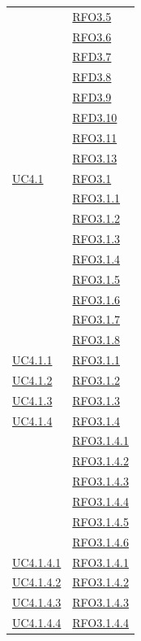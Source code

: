\begin{longtable}{|>{\centering}m{5cm}|m{5cm}<{\centering}|}
& \hyperlink{RFO3.5}{RFO3.5}\\
& \hyperlink{RFO3.6}{RFO3.6}\\
& \hyperlink{RFD3.7}{RFD3.7}\\
& \hyperlink{RFD3.8}{RFD3.8}\\
& \hyperlink{RFD3.9}{RFD3.9}\\
& \hyperlink{RFD3.10}{RFD3.10}\\
& \hyperlink{RFO3.11}{RFO3.11}\\
& \hyperlink{RFO3.13}{RFO3.13}\\ \hline
\hyperref[UC4.1]{UC4.1} & \hyperlink{RFO3.1}{RFO3.1}\\
& \hyperlink{RFO3.1.1}{RFO3.1.1}\\
& \hyperlink{RFO3.1.2}{RFO3.1.2}\\
& \hyperlink{RFO3.1.3}{RFO3.1.3}\\
& \hyperlink{RFO3.1.4}{RFO3.1.4}\\
& \hyperlink{RFO3.1.5}{RFO3.1.5}\\
& \hyperlink{RFO3.1.6}{RFO3.1.6}\\
& \hyperlink{RFO3.1.7}{RFO3.1.7}\\
& \hyperlink{RFO3.1.8}{RFO3.1.8}\\ \hline
\hyperref[UC4.1.1]{UC4.1.1} & \hyperlink{RFO3.1.1}{RFO3.1.1}\\ \hline
\hyperref[UC4.1.2]{UC4.1.2} & \hyperlink{RFO3.1.2}{RFO3.1.2}\\ \hline
\hyperref[UC4.1.3]{UC4.1.3} & \hyperlink{RFO3.1.3}{RFO3.1.3}\\ \hline
\hyperref[UC4.1.4]{UC4.1.4} & \hyperlink{RFO3.1.4}{RFO3.1.4}\\
& \hyperlink{RFO3.1.4.1}{RFO3.1.4.1}\\
& \hyperlink{RFO3.1.4.2}{RFO3.1.4.2}\\
& \hyperlink{RFO3.1.4.3}{RFO3.1.4.3}\\
& \hyperlink{RFO3.1.4.4}{RFO3.1.4.4}\\
& \hyperlink{RFO3.1.4.5}{RFO3.1.4.5}\\
& \hyperlink{RFO3.1.4.6}{RFO3.1.4.6}\\ \hline
\hyperref[UC4.1.4.1]{UC4.1.4.1} & \hyperlink{RFO3.1.4.1}{RFO3.1.4.1}\\ \hline
\hyperref[UC4.1.4.2]{UC4.1.4.2} & \hyperlink{RFO3.1.4.2}{RFO3.1.4.2}\\ \hline
\hyperref[UC4.1.4.3]{UC4.1.4.3} & \hyperlink{RFO3.1.4.3}{RFO3.1.4.3}\\ \hline
\hyperref[UC4.1.4.4]{UC4.1.4.4} & \hyperlink{RFO3.1.4.4}{RFO3.1.4.4}\\ \hline

\end{longtable}
